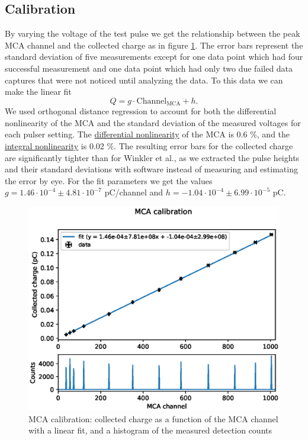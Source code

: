 \documentclass[a4paper]{article}
\begin{document}
\subsection{Calibration}
\label{results_calibration}
By varying the voltage of the test pulse we get the relationship between the peak MCA channel and the collected charge as in figure \ref{fig:mca_calibration}.
The error bars represent the standard deviation of five measurements except for one data point which had four successful measurement and one data point which had only two due failed data captures that were not noticed until analyzing the data.
To this data we can make the linear fit
\begin{equation}
Q = g \cdot \text{Channel}_\text{MCA} + h.
\label{eq:calibration}
\end{equation}
We used orthogonal distance regression to account for both the differential nonlinearity of the MCA and the standard deviation of the measured voltages for each pulser setting.
The
\href{https://en.wikipedia.org/wiki/Differential_nonlinearity}{differential nonlinearity}
of the MCA is 0.6 \%, and the
\href{https://en.wikipedia.org/wiki/Integral_nonlinearity}{integral nonlinearity}
is 0.02 \%.
The resulting error bars for the collected charge are significantly tighter than for Winkler et al., as we extracted the pulse heights and their standard deviations with software instead of measuring and estimating the error by eye.
For the fit parameters we get the values $g = 1.46 \cdot 10^{-4} \pm 4.81 \cdot 10^{-7}$ pC/channel and $h = -1.04 \cdot 10^{-4} \pm 6.99 \cdot 10^{-5}$ pC.


\begin{figure}[ht!]
\centering
\includegraphics[width=\textwidth]{fig/python/mca_calibration.eps}
\caption{MCA calibration: collected charge as a function of the MCA channel with a linear fit, and a histogram of the measured detection counts}
\label{fig:mca_calibration}
\end{figure}
\end{document}
